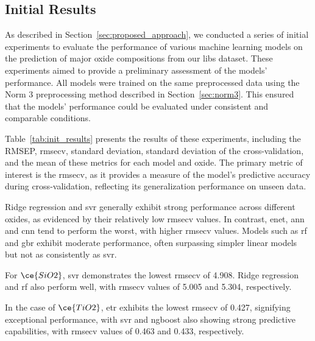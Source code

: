\subsection{Initial Results}



As described in Section~\ref{sec:proposed_approach}, we conducted a series of initial experiments to evaluate the performance of various machine learning models on the prediction of major oxide compositions from our \gls{libs} dataset.
These experiments aimed to provide a preliminary assessment of the models' performance.
All models were trained on the same preprocessed data using the Norm 3 preprocessing method described in Section~\ref{sec:norm3}.
This ensured that the models' performance could be evaluated under consistent and comparable conditions.

Table~\ref{tab:init_results} presents the results of these experiments, including the RMSEP, \gls{rmsecv}, standard deviation, standard deviation of the cross-validation, and the mean of these metrics for each model and oxide.
The primary metric of interest is the \gls{rmsecv}, as it provides a measure of the model's predictive accuracy during cross-validation, reflecting its generalization performance on unseen data.

Ridge regression and \gls{svr} generally exhibit strong performance across different oxides, as evidenced by their relatively low \gls{rmsecv} values.
In contrast, \gls{enet}, \gls{ann} and \gls{cnn} tend to perform the worst, with higher \gls{rmsecv} values.
Models such as \gls{rf} and \gls{gbr} exhibit moderate performance, often surpassing simpler linear models but not as consistently as \gls{svr}.

For $\ce{SiO2}$, \gls{svr} demonstrates the lowest \gls{rmsecv} of 4.908.
Ridge regression and \gls{rf} also perform well, with \gls{rmsecv} values of 5.005 and 5.304, respectively.

In the case of $\ce{TiO2}$, \gls{etr} exhibits the lowest \gls{rmsecv} of 0.427, signifying exceptional performance, with \gls{svr} and \gls{ngboost} also showing strong predictive capabilities, with \gls{rmsecv} values of 0.463 and 0.433, respectively.

